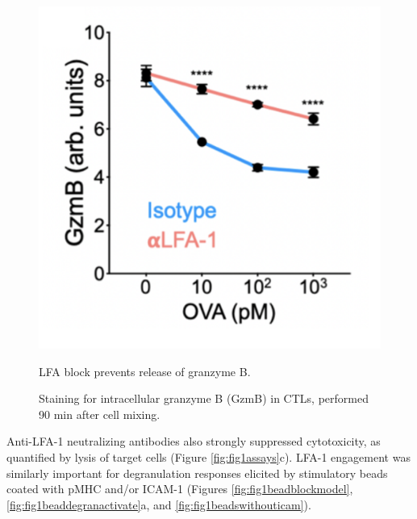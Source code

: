 \begin{figure}[htbp]
	\centering
	\includegraphics[width=0.6\columnwidth]{../figures/chapter3/fig1gzmb.png}
	\caption{LFA block prevents release of granzyme B.}
	\caption*{Staining for intracellular granzyme B (GzmB) in CTLs, performed 90 min after cell mixing.}
	\label{fig:fig1gzmb}
\end{figure} 

Anti-LFA-1 neutralizing antibodies also strongly suppressed cytotoxicity, as quantified by lysis of target cells (Figure \ref{fig:fig1assays}c).  LFA-1 engagement was similarly important for degranulation responses elicited by stimulatory beads coated with pMHC and/or ICAM-1 (Figures \ref{fig:fig1beadblockmodel}, \ref{fig:fig1beaddegranactivate}a, and \ref{fig:fig1beadswithouticam}). 

